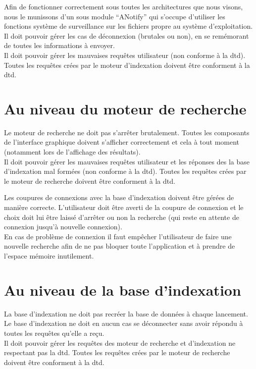 \documentclass[a4paper,12pt]{report}
\begin{document}
Afin de fonctionner correctement sous toutes les architectures que nous visons, nous le munissons d'un sous module \enquote{ANotify} qui s'occupe d'utiliser les fonctions système de surveillance sur les \glspl{fichier} propre au système d'exploitation.\\
Il doit pouvoir gérer les cas de déconnexion (brutales ou non), en se remémorant de toutes les informations à envoyer.\\
Il doit pouvoir gérer les mauvaises requêtes utilisateur (non conforme à la \gls{dtd}). Toutes les requêtes crées par le moteur d'indexation doivent être conforment à la \gls{dtd}.

\section{Au niveau du moteur de recherche}
Le moteur de recherche ne doit pas s'arrêter brutalement. Toutes les composants de l'interface graphique doivent s'afficher correctement et cela à tout moment (notamment lors de l'affichage des résultats).\\
Il doit pouvoir gérer les mauvaises requêtes utilisateur et les réponses des la base d'indexation mal formées (non conforme à la \gls{dtd}). Toutes les requêtes crées par le moteur de recherche doivent être conforment à la \gls{dtd}.

Les coupures de connexions avec la base d'indexation doivent être gérées de manière correcte. L'utilisateur doit être averti de la coupure de connexion et le choix doit lui être laissé d'arrêter ou non la recherche (qui reste en attente de connexion jusqu'à nouvelle connexion).\\
En cas de problème de connexion il faut empêcher l'utilisateur de faire une nouvelle recherche afin de ne pas bloquer toute l'application et à prendre de l'espace mémoire inutilement.

\section{Au niveau de la base d'indexation}
La base d'indexation ne doit pas recréer la base de données à chaque lancement.\\
Le base d'indexation ne doit en aucun cas se déconnecter sans avoir répondu à toutes les requêtes qu'elle a reçu.\\
Il doit pouvoir gérer les requêtes des moteur de recherche et d'indexation ne respectant pas la \gls{dtd}. Toutes les requêtes crées par le moteur de recherche doivent être conforment à la \gls{dtd}.
\end{document}
